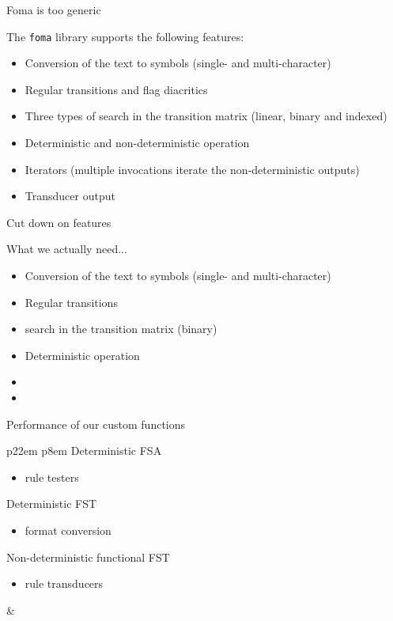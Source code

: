 \documentclass[utf8x,t,aspectratio=169,xcolor={dvipsnames}]{beamer}
\newcommand{\vitem}{\item \vspace{4pt}}
\begin{document}
\begin{frame}{Foma is too generic}

The \texttt{foma} library supports the following features:
\begin{itemize}
  \vitem Conversion of the text to symbols (single- and multi-character)
  \vitem Regular transitions and flag diacritics
  \vitem Three types of search in the transition matrix (linear, binary and indexed)
  \vitem Deterministic and non-deterministic operation
  \vitem Iterators (multiple invocations iterate the non-deterministic outputs)
  \vitem Transducer output
\end{itemize}
\end{frame}

\begin{frame}{Cut down on features}

What we actually need...
\begin{itemize}
  \vitem Conversion of the text to symbols (single- and multi-character)
  \vitem Regular transitions 
  \vitem {} search in the transition matrix (binary)
  \vitem Deterministic operation
  \vitem {}
  \vitem {}
\end{itemize}

\end{frame}

\begin{frame}{Performance of our custom functions}
\begin{tabular}{p{22em} p{8em}}
Deterministic FSA
\begin{itemize}
    \vitem rule testers
\end{itemize}
Deterministic FST
\begin{itemize}
    \vitem format conversion
\end{itemize}
Non-deterministic functional FST
\begin{itemize}
    \vitem rule transducers
\end{itemize}
&
\end{tabular}

\end{frame}
\end{document}
